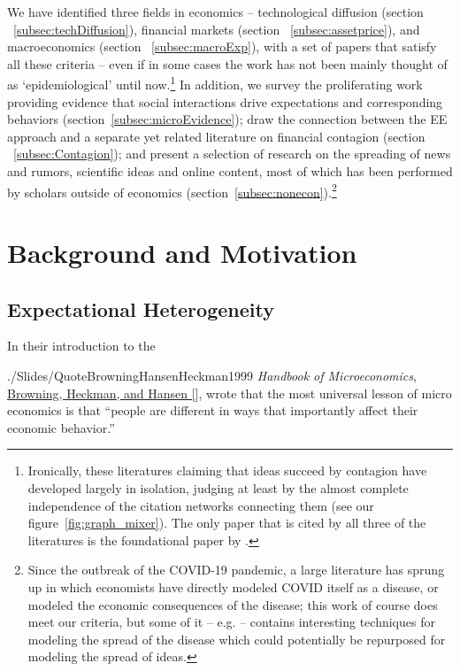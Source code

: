 We have identified three fields in economics -- technological diffusion (section ~\ref{subsec:techDiffusion}), financial markets (section ~\ref{subsec:assetprice}), and macroeconomics (section ~\ref{subsec:macroExp}), with a set of papers that satisfy all these criteria -- even if in some cases the work has not been mainly thought of as `epidemiological' until now.\footnote{Ironically, these literatures claiming that ideas succeed by contagion have developed largely in isolation, judging at least by the almost complete independence of the citation networks connecting them (see our figure~\ref{fig:graph_mixer}). The only paper that is cited by all three of the literatures is the foundational paper by \cite{kermack_contribution_1927}.}  In addition, we survey the proliferating work providing evidence that social interactions drive expectations and corresponding behaviors (section~\ref{subsec:microEvidence}); draw the connection between the EE approach and a separate yet related literature on financial contagion (section ~\ref{subsec:Contagion}); and present a selection of research on the spreading of news and rumors, scientific ideas and online content, most of which has been performed by scholars outside of economics (section~\ref{subsec:nonecon}).\footnote{Since the outbreak of the COVID-19 pandemic, a large literature has sprung up in which economists have directly modeled COVID itself as a disease, or modeled the economic consequences of the disease; this work of course does meet our criteria, but some of it -- e.g. \cite{gourieroux2020time} -- contains interesting techniques for modeling the spread of the disease which could potentially be repurposed for modeling the spread of ideas.}

\section{Background and Motivation}\label{motivation-and-context}

\subsection{Expectational Heterogeneity}\label{EpiExpHet}\hypertarget{EpiExpHet}{}

In their introduction to the
\begin{verbatimwrite}{./Slides/QuoteBrowningHansenHeckman1999}%
  \textit{Handbook of Microeconomics}, \href{http://larspeterhansen.org/wp-content/uploads/2016/11/Microdata-and-GE-Models.pdf}{Browning, Heckman, and Hansen [\citeyear{browning_chapter_1999}}], wrote that the most universal lesson of micro economics is that ``people are different in ways that importantly affect their economic behavior.''
\end{verbatimwrite}%


